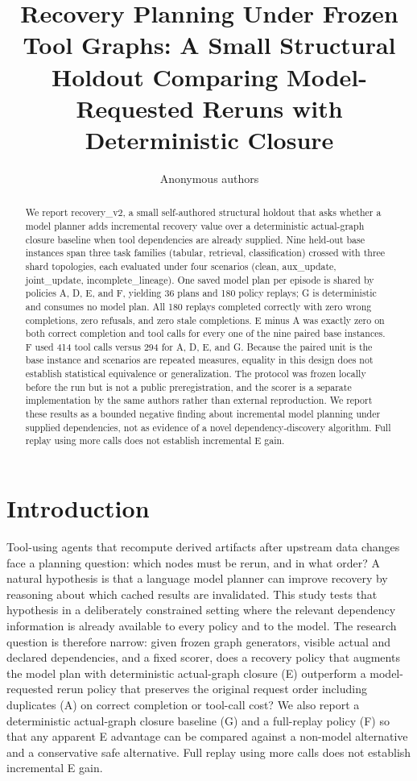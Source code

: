 \documentclass{article}
\title{Recovery Planning Under Frozen Tool Graphs: A Small Structural Holdout Comparing Model-Requested Reruns with Deterministic Closure}
\author{Anonymous authors}
\begin{document}
\maketitle


\begin{abstract}

We report recovery\_v2, a small self-authored structural holdout that asks whether a model planner adds incremental recovery value over a deterministic actual-graph closure baseline when tool dependencies are already supplied. Nine held-out base instances span three task families (tabular, retrieval, classification) crossed with three shard topologies, each evaluated under four scenarios (clean, aux\_update, joint\_update, incomplete\_lineage). One saved model plan per episode is shared by policies A, D, E, and F, yielding 36 plans and 180 policy replays; G is deterministic and consumes no model plan. All 180 replays completed correctly with zero wrong completions, zero refusals, and zero stale completions. E minus A was exactly zero on both correct completion and tool calls for every one of the nine paired base instances. F used 414 tool calls versus 294 for A, D, E, and G. Because the paired unit is the base instance and scenarios are repeated measures, equality in this design does not establish statistical equivalence or generalization. The protocol was frozen locally before the run but is not a public preregistration, and the scorer is a separate implementation by the same authors rather than external reproduction. We report these results as a bounded negative finding about incremental model planning under supplied dependencies, not as evidence of a novel dependency-discovery algorithm. Full replay using more calls does not establish incremental E gain.

\end{abstract}

\section{Introduction}

Tool-using agents that recompute derived artifacts after upstream data changes face a planning question: which nodes must be rerun, and in what order? A natural hypothesis is that a language model planner can improve recovery by reasoning about which cached results are invalidated. This study tests that hypothesis in a deliberately constrained setting where the relevant dependency information is already available to every policy and to the model. The research question is therefore narrow: given frozen graph generators, visible actual and declared dependencies, and a fixed scorer, does a recovery policy that augments the model plan with deterministic actual-graph closure (E) outperform a model-requested rerun policy that preserves the original request order including duplicates (A) on correct completion or tool-call cost? We also report a deterministic actual-graph closure baseline (G) and a full-replay policy (F) so that any apparent E advantage can be compared against a non-model alternative and a conservative safe alternative. Full replay using more calls does not establish incremental E gain.
\end{document}

